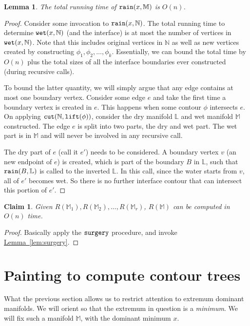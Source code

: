 \documentclass[11pt]{article}
\newtheorem{lemma}[theorem]{Lemma}
\newtheorem{claim}[theorem]{Claim}
\theoremstyle{definition}
\newcommand{\LL}{\mathbb{L}}
\newcommand{\MM}{\mathbb{M}}
\newcommand{\NN}{\mathbb{N}}
\newcommand{\Lem}[1]{\hyperref[lem:#1]{Lemma~\ref*{lem:#1}}} %
\newcommand{\cut}{{\tt cut}}
\newcommand{\lift}{{\tt lift}}
\newcommand{\rain}{{\tt rain}}
\newcommand{\reeb}{R}
\newcommand{\surgery}{{\tt surgery}}
\newcommand{\wet}{{\tt wet}}
\begin{document}
\begin{lemma} \label{lem:rain-time} The total running time of $\rain(x,\MM)$ is $O(n)$.
\end{lemma}

\begin{proof} Consider some invocation to $\rain(x,\NN)$. The total running time to determine
$\wet(x,\NN)$ (and the interface) is at most the number of vertices in $\wet(x,\NN)$. Note that
this includes original vertices in $\NN$ as well as new vertices created by constructing
$\phi_1, \phi_2, \ldots, \phi_k$. Essentially, we can bound the total time by $O(n)$ plus
the total sizes of all the interface boundaries ever constructed (during recursive calls).

To bound the latter quantity, we will simply argue that any edge contains at most
one boundary vertex. Consider some edge $e$ and take the first time a boundary vertex is created in $e$.
This happens when some contour $\phi$ intersects $e$. On applying $\cut(\NN,\lift(\phi))$,
consider the dry manifold $\LL$ and wet manifold $\MM$ constructed. The edge $e$ is split into two parts, the dry and wet part.
The wet part is in $\MM$ and will never be involved in any recursive call.

The dry part of $e$ (call it $e'$) needs to be considered.
A boundary vertex $v$ (an new endpoint of $e$) is created, which is part of the boundary $B$ in $\LL$,
such that $\rain(B,\LL)$ is called to the inverted $\LL$. In this call, since the water starts from $v$,
all of $e'$ becomes wet. So there is no further interface contour that can intersect this portion of $e'$.
\end{proof}

\begin{claim} \label{clm:rain-reeb} Given $\reeb(\MM_1), \reeb(\MM_2), \ldots, \reeb(\MM_r)$,
$\reeb(\MM)$ can be computed in $O(n)$ time.
\end{claim}

\begin{proof} Basically apply the $\surgery$ procedure, and invoke \Lem{surgery}.
\end{proof}

\section{Painting to compute contour trees} \label{sec:paint}

What the previous section allows us to restrict attention to extremum dominant manifolds.
We will orient so that the extremum in question is a \emph{minimum}.
We will fix such a manifold $\MM$, with the dominant minimum $x$. 
\end{document}
